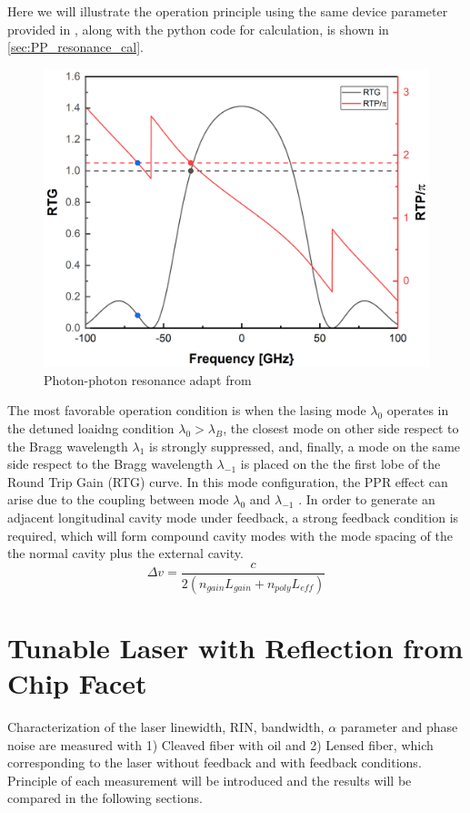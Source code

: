Here we will illustrate the operation principle using the same device parameter provided in \cite{montrosset2014laser}, along with the python code for calculation, is shown in \autoref{sec:PP_resonance_cal}.
\begin{figure}[ht]
    \centering
    \includegraphics[width=.6\linewidth]{figures/PP_resonance_operation_principle.png}
    \caption{Photon-photon resonance adapt from \cite{montrosset2014laser}}
    \label{fig:PP_resonance_operation_principle}
\end{figure}

The most favorable operation condition is when the lasing mode $\lambda_0$ operates in the detuned loaidng condition $\lambda_0>\lambda_B$, the closest mode on other side respect to the Bragg wavelength $\lambda_1$ is strongly suppressed, and, finally, a mode on the same side respect to the Bragg wavelength $\lambda_{-1}$ is placed on the the first lobe of the Round Trip Gain (RTG) curve. In this mode configuration, the PPR effect can arise due to the coupling between mode $\lambda_0$ and $\lambda_{-1}$ \cite{montrosset2014laser}. In order to generate an adjacent longitudinal cavity mode under feedback, a strong feedback condition is required, which will form compound cavity modes with the mode spacing of the the normal cavity plus the external cavity.
\begin{equation}
    \Delta v=\frac{c}{2(n_{gain}L_{gain}+n_{poly}L_{eff})}
    \label{mode_spacing}
\end{equation}

\chapter{Tunable Laser with Reflection from Chip Facet}\label{ch:normal_laser}
Characterization of the laser linewidth, RIN, bandwidth, $\alpha$ parameter and phase noise are measured with 1) Cleaved fiber with oil and 2) Lensed fiber, which corresponding to the laser without feedback and with feedback conditions. Principle of each measurement will be introduced and the results will be compared in the following sections.

